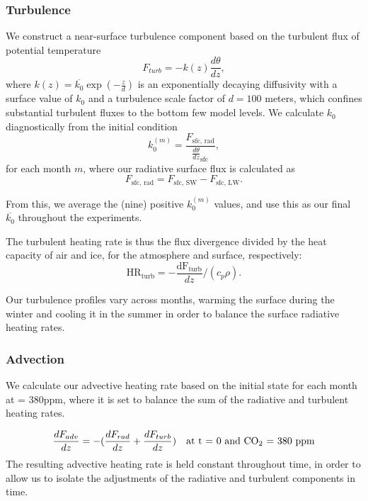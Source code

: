 \documentclass[draft]{agujournal2019}
\begin{document}
\subsubsection{Turbulence}
We construct a near-surface turbulence component based on the turbulent flux of potential temperature
\begin{equation}
    F_{turb} = -k(z) \frac{d\theta}{dz},
\end{equation}
where $k(z) = \overline{k_0} \exp(-\frac{z}{d})$ is an exponentially decaying diffusivity with a surface value of $k_0$ and a turbulence scale factor of $d = 100$ meters, which confines substantial turbulent fluxes to the bottom few model levels. We calculate $k_0$ diagnostically from the initial condition
\begin{equation}
    k_0^{(m)} = \frac{F_{\text{sfc, rad}}}{\frac{d\theta}{dz}_{\text{sfc}}},
\end{equation}
for each month $m$, where our radiative surface flux is calculated as
\begin{equation}
    F_{\text{sfc, rad}} = F_{\text{sfc, SW}} - F_{\text{sfc, LW}}.
\end{equation}

From this, we average the (nine) positive $k_0^{(m)}$ values, and use this as our final $\overline{k_0}$ throughout the experiments.

The turbulent heating rate is thus the flux divergence divided by the heat capacity of air and ice, for the atmosphere and surface, respectively:
\begin{equation}
    \text{HR}_{\text{turb}} = -\frac{\text{dF}_{\text{turb}}}{dz} /(c_p \rho).
\end{equation}

Our turbulence profiles vary across months, warming the surface during the winter and cooling it in the summer in order to balance the surface radiative heating rates.

\subsubsection{Advection}
We calculate our advective heating rate based on the initial state for each month at  = 380ppm, where it is set to balance the sum of the radiative and turbulent heating rates.

\begin{equation}
    \frac{dF_{adv}}{dz} = -(\frac{dF_{rad}}{dz} + \frac{dF_{turb}}{dz})\quad \text{at t = 0 and \ce{CO_2} = 380 ppm}
\end{equation}
The resulting advective heating rate is held constant throughout time, in order to allow us to isolate the adjustments of the radiative and turbulent components in time. 
\end{document}
